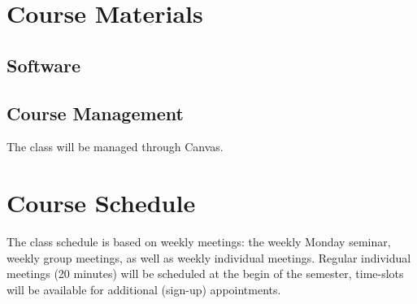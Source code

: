 \documentclass[letterpaper,oneside,10pt]{scrartcl}
\begin{document}
    \section{Course Materials}

        \subsection{Software}
             
            
        \subsection{Course Management}
            The class will be managed through Canvas.
            
\section{Course Schedule}
    The class schedule is based on weekly meetings: the weekly Monday seminar, weekly group meetings, as well as weekly individual meetings. Regular individual meetings (20 minutes) will be scheduled at the begin of the semester, time-slots will be available for additional (sign-up) appointments.
    
\end{document}
